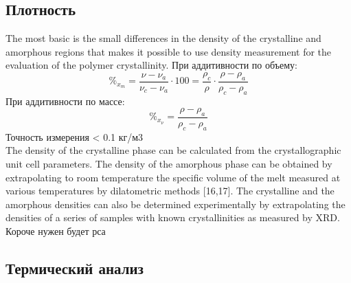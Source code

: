 \subsection{Плотность}
The most basic is the
small differences in the density of the crystalline and amorphous regions that makes it
possible to use density measurement for the evaluation of the polymer crystallinity.
При аддитивности по объему:
\[
\%_{x_m} =\frac{\nu - \nu_a}{\nu_c - \nu_a}\cdot100 = \frac{\rho_c}{\rho}\cdot\frac{\rho - \rho_a}{\rho_c-\rho_a}
\]
При аддитивности по массе:
\[
\%_{x_{\nu}} =\frac{\rho - \rho_a}{\rho_c-\rho_a}
\]
Точность измерения < 0.1 кг/м3\\
The density of the crystalline phase
can be calculated from the crystallographic unit cell parameters. The density of
the amorphous phase can be obtained by extrapolating to room temperature the specific
volume of the melt measured at various temperatures by dilatometric methods
[16,17]. The crystalline and the amorphous densities can also be determined experimentally
by extrapolating the densities of a series of samples with known crystallinities
as measured by XRD.\\
Короче нужен будет рса

\subsection{Термический анализ}


